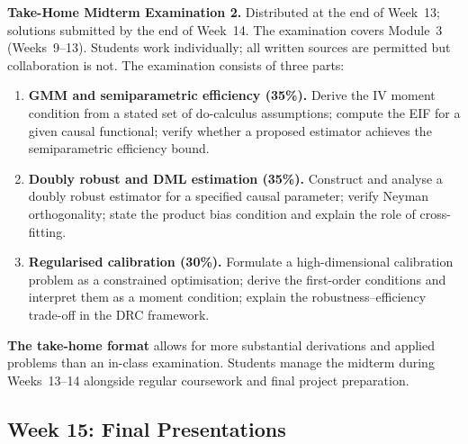 \documentclass[12pt]{article}
\begin{document}
\begin{exambox}
\noindent\textbf{\color{darkblue}Take-Home Midterm Examination 2.}
Distributed at the end of Week~13; solutions submitted by the end of
Week~14.  The examination covers Module~3 (Weeks~9--13).  Students
work individually; all written sources are permitted but collaboration
is not.  The examination consists of three parts:

\begin{enumerate}
  \item \textbf{GMM and semiparametric efficiency (35\%).}
    Derive the IV moment condition from a stated set of do-calculus
    assumptions; compute the EIF for a given causal functional;
    verify whether a proposed estimator achieves the semiparametric
    efficiency bound.

  \item \textbf{Doubly robust and DML estimation (35\%).}
    Construct and analyse a doubly robust estimator for a specified
    causal parameter; verify Neyman orthogonality; state the product
    bias condition and explain the role of cross-fitting.

  \item \textbf{Regularised calibration (30\%).}
    Formulate a high-dimensional calibration problem as a constrained
    optimisation; derive the first-order conditions and interpret them
    as a moment condition; explain the robustness--efficiency trade-off
    in the DRC framework.
\end{enumerate}

\noindent\textbf{The take-home format} allows for more substantial
derivations and applied problems than an in-class examination.
Students manage the midterm during Weeks~13--14 alongside regular
coursework and final project preparation.
\end{exambox}

\subsection*{Week 15: Final Presentations}
\end{document}
